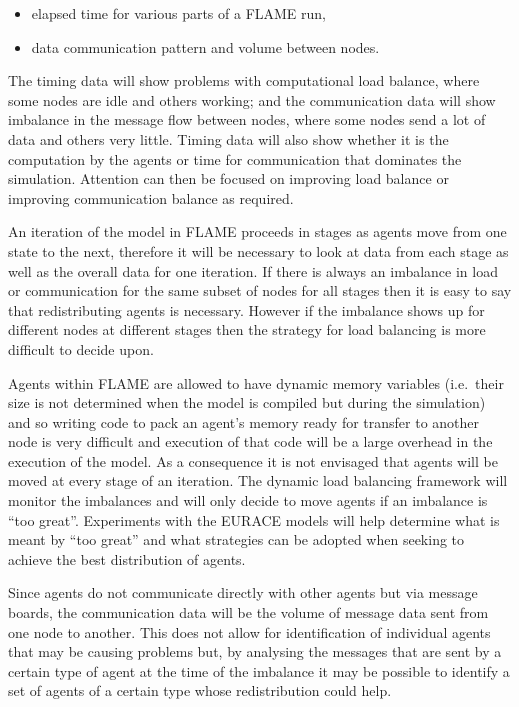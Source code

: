 \begin{itemize}
 \item elapsed time for various parts of a FLAME run,
 \item data communication pattern and volume between nodes.
\end{itemize}

The timing data will show problems with computational load balance, where some nodes are idle and others working; and the communication data will show imbalance in the message flow between nodes, where some nodes send a lot of data and others very little. Timing data will also show whether it is the computation by the agents or time for communication that dominates the simulation. Attention can then be focused on improving load balance or improving communication balance as required.

An iteration of the model in FLAME proceeds in stages as agents move from one state to the next, therefore it will be necessary to look at data from each stage as well as the overall data for one iteration. If there is always an imbalance in load or communication for the same subset of nodes for all stages then it is easy to say that redistributing agents is necessary. However if the imbalance shows up for different nodes at different stages then the strategy for load balancing is more difficult to decide upon. 

Agents within FLAME are allowed to have dynamic memory variables (i.e.\ their size is not determined when the model is compiled but during the simulation) and so writing code to pack an agent's memory ready for transfer to another node is very difficult and execution of that code will be a large overhead in the execution of the model. As a consequence it is not envisaged that agents will be moved at every stage of an iteration. The dynamic load balancing framework will monitor the imbalances and will only decide to move agents if an imbalance is ``too great''. Experiments with the EURACE models will help determine what is meant by ``too great'' and what strategies can be adopted when seeking to achieve the best distribution of agents.

Since agents do not communicate directly with other agents but via message boards, the communication data will be the volume of message data sent from one node to another. This does not allow for identification of individual agents that may be causing problems but, by analysing the messages that are sent by a certain type of agent at the time of the imbalance it may be possible to identify a set of agents of a certain type whose redistribution could help.

